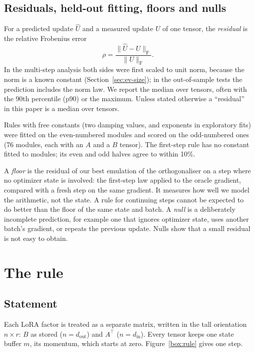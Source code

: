 \documentclass[11pt]{article}
\newcommand{\fro}{\mathrm{F}}
\begin{document}
\subsection{Residuals, held-out fitting, floors and nulls}\label{sec:metric}
For a predicted update $\hat U$ and a measured update $U$ of one tensor, the \emph{residual} is the
relative Frobenius error
\[
\rho=\frac{\|\hat U-U\|_\fro}{\|U\|_\fro}.
\]
In the multi-step analysis both sides were first scaled to unit norm, because the norm is a known
constant (Section~\ref{sec:ev-size}); in the out-of-sample tests the prediction includes the norm
law. We report the median over tensors, often with the 90th percentile (p90) or the maximum. Unless
stated otherwise a ``residual'' in this paper is a median over tensors.

Rules with free constants (two damping values, and exponents in exploratory fits) were fitted on the
even-numbered modules and scored on the odd-numbered ones (76 modules, each with an $A$ and a $B$
tensor). The first-step rule has no constant fitted to modules; its even and odd halves agree to
within 10\%.

A \emph{floor} is the residual of our best emulation of the orthogonaliser on a step where no
optimizer state is involved: the first-step law applied to the oracle gradient, compared with a
fresh step on the same gradient. It measures how well we model the arithmetic, not the state. A rule
for continuing steps cannot be expected to do better than the floor of the same state and batch. A
\emph{null} is a deliberately incomplete prediction, for example one that ignores optimizer state,
uses another batch's gradient, or repeats the previous update. Nulls show that a small residual is
not easy to obtain.

\section{The rule}\label{sec:rule}

\subsection{Statement}
Each LoRA factor is treated as a separate matrix, written in the tall orientation $n\times r$:
$B$ as stored ($n=d_\text{out}$) and $A^\top$ ($n=d_\text{in}$). Every tensor keeps one state
buffer $m$, its momentum, which starts at zero. Figure~\ref{box:rule} gives one step.
\end{document}

